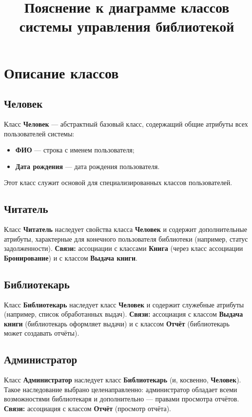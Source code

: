 \documentclass[a4paper,12pt]{article}
\title{Пояснение к диаграмме классов системы управления библиотекой}
\date{}
\begin{document}
\maketitle

\section{Описание классов}

\subsection{Человек}
Класс \textbf{Человек} — абстрактный базовый класс, содержащий общие атрибуты всех пользователей системы:
\begin{itemize}
    \item \textbf{ФИО} --- строка с именем пользователя;
    \item \textbf{Дата рождения} --- дата рождения пользователя.
\end{itemize}
Этот класс служит основой для специализированных классов пользователей.

\subsection{Читатель}
Класс \textbf{Читатель} наследует свойства класса \textbf{Человек} и содержит дополнительные атрибуты, характерные для конечного пользователя библиотеки (например, статус задолженности).  
\textbf{Связи:} ассоциации с классами \textbf{Книга} (через класс ассоциации \textbf{Бронирование}) и с классом \textbf{Выдача книги}.

\subsection{Библиотекарь}
Класс \textbf{Библиотекарь} наследует класс \textbf{Человек} и содержит служебные атрибуты (например, список обработанных выдач).  
\textbf{Связи:} ассоциация с классом \textbf{Выдача книги} (библиотекарь оформляет выдачи) и с классом \textbf{Отчёт} (библиотекарь может создавать отчёты).

\subsection{Администратор}
Класс \textbf{Администратор} наследует класс \textbf{Библиотекарь} (и, косвенно, \textbf{Человек}). Такое наследование выбрано целенаправленно: администратор обладает всеми возможностями библиотекаря и дополнительно — правами просмотра отчётов.  
\textbf{Связи:} ассоциация с классом \textbf{Отчёт} (просмотр отчёта).
\end{document}
